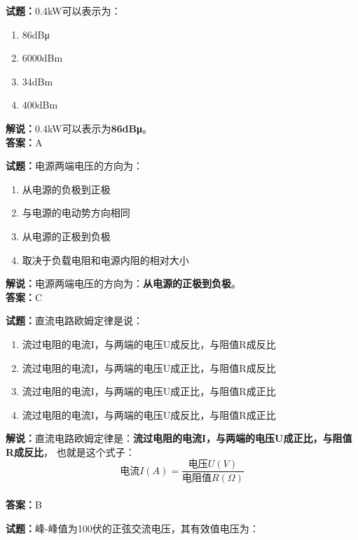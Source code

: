 \documentclass{ctexbook}
\begin{document}
\bigskip


\noindent\textbf{试题：}0.4kW可以表示为：

\begin{enumerate}[leftmargin=3em]
	\item 86dBμ
	\item 6000dBm
	\item 34dBm
	\item 400dBm
\end{enumerate}

\noindent\textbf{解说：}0.4kW可以表示为\textbf{86dBμ}。\\\noindent\textbf{答案：}A%


\bigskip


\noindent\textbf{试题：}电源两端电压的方向为：

\begin{enumerate}[leftmargin=3em]
	\item 从电源的负极到正极
	\item 与电源的电动势方向相同
	\item 从电源的正极到负极
	\item 取决于负载电阻和电源内阻的相对大小
\end{enumerate}

\noindent\textbf{解说：}电源两端电压的方向为：\textbf{从电源的正极到负极}。\\\noindent\textbf{答案：}C


\bigskip


\noindent\textbf{试题：}直流电路欧姆定律是说：

\begin{enumerate}[leftmargin=3em]
	\item 流过电阻的电流I，与两端的电压U成反比，与阻值R成反比
	\item 流过电阻的电流I，与两端的电压U成正比，与阻值R成反比
	\item 流过电阻的电流I，与两端的电压U成正比，与阻值R成正比
	\item 流过电阻的电流I，与两端的电压U成反比，与阻值R成正比
\end{enumerate}

\noindent\textbf{解说：}直流电路欧姆定律是：\textbf{流过电阻的电流I，与两端的电压U成正比，与阻值R成反比}，
也就是这个式子：$$\mbox{电流}I(A)=\frac{\mbox{电压}U(V)}{\mbox{电阻值}R(\Omega)}$$\\\noindent\textbf{答案：}B%


\bigskip


\noindent\textbf{试题：}峰-峰值为100伏的正弦交流电压，其有效值电压为：
\end{document}
